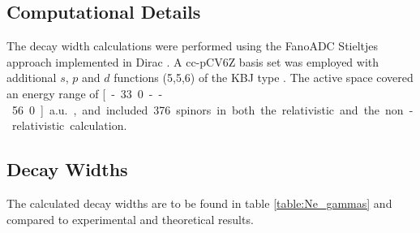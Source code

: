 \subsection{Computational Details}
The decay width calculations were performed using the FanoADC Stieltjes approach
implemented in Dirac \cite{DIRAC13}. A cc-pCV6Z basis set was employed with
additional $s$, $p$ and $d$ functions (5,5,6) of the \ac{KBJ} type \cite{Kaufmann89}.
The active space covered an energy range of \unit[-33.0 -- 56.0]{a.u.}, and included
376 spinors in both the relativistic and the non-relativistic calculation.

\subsection{Decay Widths}
The calculated decay widths are to be found in table \ref{table:Ne_gammas}
and compared to experimental and theoretical results.

